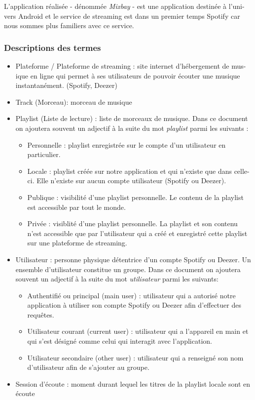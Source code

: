 \documentclass{article}
\begin{document}
		L'application réalisée - dénommée \textit{Mixbay} - est une application destinée à l'uni- vers Android et le service de streaming est dans un premier temps Spotify car nous sommes plus familiers avec ce service.
								
		\subsubsection{Descriptions des termes}
		\begin{itemize}
		    \item Plateforme / Plateforme de streaming : site internet d’hébergement de mus- ique en ligne qui permet à ses utilisateurs de pouvoir écouter une musique instantanément. (Spotify, Deezer)
			\item Track (Morceau): morceau de musique
			\item Playlist (Liste de lecture) : liste de morceaux de musique. Dans ce document on ajoutera souvent un adjectif à la suite du mot \textit{playlist} parmi les suivants : 
			      \begin{itemize}
			      	\item Personnelle : playlist enregistrée sur le compte d'un utilisateur en particulier.
			      	\item Locale : playlist créée sur notre application et qui n'existe que dans celle-ci. Elle n'existe sur aucun compte utilisateur (Spotify ou Deezer).
			      	\item Publique : visibilité d'une playlist personnelle. Le contenu de la playlist est accessible par tout le monde.
			      	\item Privée : visiblité d'une playlist personnelle. La playlist et son contenu n'est accessible que par l'utilisateur qui a créé et enregistré cette playlist sur une plateforme de streaming.
			      \end{itemize}
			\item Utilisateur : personne physique détentrice d'un compte Spotify ou Deezer. Un ensemble d'utilisateur constitue un groupe.\newline
			Dans ce document on ajoutera souvent un adjectif à la suite du mot \textit{utilisateur} parmi les suivants:
			      \begin{itemize}
			      	\item Authentifié ou principal (main user) : utilisateur qui a autorisé notre application à utiliser son compte Spotify ou Deezer afin d'effectuer des requêtes.
			      	\item Utilisateur courant (current user) : utilisateur qui a l'appareil en main et qui s'est désigné comme celui qui interagit avec l'application.
			      	\item Utilisateur secondaire (other user) : utilisateur qui a renseigné son nom d'utilisateur afin de s'ajouter au groupe.
			      \end{itemize}
			\item Session d'écoute : moment durant lequel les titres de la playlist locale sont en écoute
		\end{itemize}
		
\end{document}
